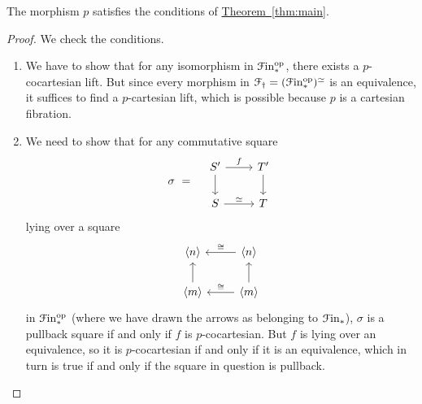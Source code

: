 \documentclass[main.tex]{subfiles}
\begin{document}
\begin{lemma}
  The morphism $p$ satisfies the conditions of \hyperref[thm:main]{Theorem~\ref*{thm:main}}.
\end{lemma}
\begin{proof}
  We check the conditions.
  \begin{enumerate}
    \item We have to show that for any isomorphism in $\mathcal{F}\mathrm{in}_{*}^{\mathrm{op}}$, there exists a $p$-cocartesian lift. But since every morphism in $\mathcal{F}_{\dagger} = (\mathcal{F}\mathrm{in}_{*}^{\mathrm{op}})^{\simeq}$ is an equivalence, it suffices to find a $p$-cartesian lift, which is possible because $p$ is a cartesian fibration.

    \item We need to show that for any commutative square
      \begin{equation*}
        \sigma \ = \quad
        \begin{tikzcd}
          S'
          \arrow[r, "f"]
          \arrow[d]
          & T'
          \arrow[d]
          \\
          S
          \arrow[r, "\simeq"]
          & T
        \end{tikzcd}
      \end{equation*}
      lying over a square
      \begin{equation*}
        \begin{tikzcd}
          \langle n \rangle
          & \langle n \rangle
          \arrow[l, swap, "\cong"]
          \\
          \langle m \rangle
          \arrow[u]
          & \langle m \rangle
          \arrow[l, swap, "\cong"]
          \arrow[u]
        \end{tikzcd}
      \end{equation*}
      in $\mathcal{F}\mathrm{in}_{*}^{\mathrm{op}}$ (where we have drawn the arrows as belonging to $\mathcal{F}\mathrm{in}_{*}$), $\sigma$ is a pullback square if and only if $f$ is $p$-cocartesian. But $f$ is lying over an equivalence, so it is $p$-cocartesian if and only if it is an equivalence, which in turn is true if and only if the square in question is pullback.
  \end{enumerate}
\end{proof}
\end{document}
